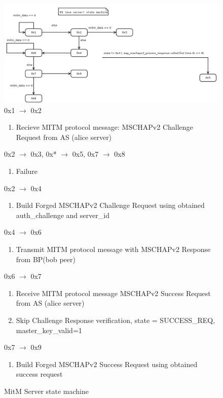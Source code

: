 \documentclass{amsart}
\begin{document}
\begin{figure}
  \centering \includegraphics[scale=0.5]
    {res/eve-server-mitm-state-machine-diagram.png}
  0x1 $\rightarrow$ 0x2
  \begin{enumerate}
    \item Recieve MITM protocol message: MSCHAPv2 Challenge
      Request from AS (alice server)
  \end{enumerate}
  0x2 $\rightarrow$ 0x3, 0x* $\rightarrow$ 0x5, 0x7 $\rightarrow$ 0x8
  \begin{enumerate}
    \item Failure
  \end{enumerate}
  0x2 $\rightarrow$ 0x4
  \begin{enumerate}
    \item Build Forged MSCHAPv2 Challenge
      Request using obtained auth\_challenge and server\_id
  \end{enumerate}
  0x4 $\rightarrow$ 0x6
  \begin{enumerate}
    \item Transmit MITM protocol message with MSCHAPv2 Response from BP(bob peer)
  \end{enumerate}
  0x6 $\rightarrow$ 0x7
  \begin{enumerate}
    \item Receive MITM protocol message MSCHAPv2 Success
      Request from AS (alice server)
    \item Skip Challenge Response verification,
      state = SUCCESS\_REQ, master\_key\_valid=1
  \end{enumerate}
  0x7 $\rightarrow$ 0x9
  \begin{enumerate}
    \item Build Forged MSCHAPv2 Success Request using obtained success request
  \end{enumerate}
  \caption{MitM Server state machine}
\end{figure}
\end{document}

